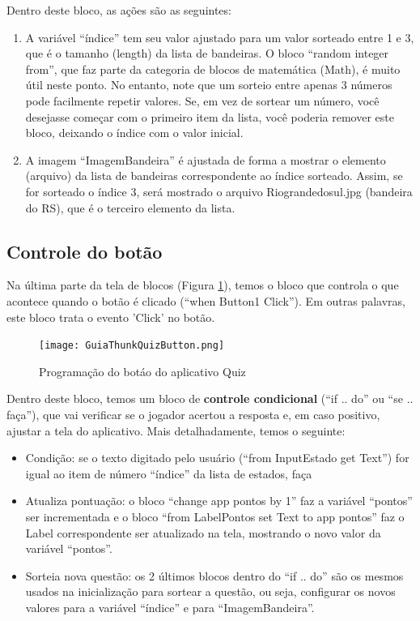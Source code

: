 \documentclass[11pt,fleqn]{book} %
\begin{document}
	


Dentro deste bloco, as ações são as seguintes:
\begin{enumerate}
\item A variável ``índice'' tem seu valor ajustado para um valor sorteado entre 1 e 3, que é o tamanho (length) da lista de bandeiras. O bloco ``random integer from'', que faz parte da categoria de blocos de matemática (Math), é muito útil neste ponto. No entanto, note que um sorteio entre apenas 3 números pode facilmente repetir valores. Se, em vez de sortear um número, você desejasse começar com o primeiro item da lista, você poderia remover este bloco, deixando o índice com o valor inicial.
\item A imagem ``ImagemBandeira'' é ajustada de forma a mostrar o elemento (arquivo) da lista de bandeiras correspondente ao índice sorteado. Assim, se for sorteado o índice 3, será mostrado o arquivo Riograndedosul.jpg (bandeira do RS), que é o terceiro elemento da lista.

\end{enumerate}

\subsection{Controle do botão}

Na última parte da tela de blocos (Figura \ref{fig:quizbutton}), temos o bloco que controla o que acontece quando o botão é clicado (``when Button1 Click''). Em outras palavras, este bloco trata o evento 'Click' no botão. 

\begin{figure}[H]
	\centering
	\texttt{[image: GuiaThunkQuizButton.png]}\hspace{0.2cm}
    \caption{Programação do botáo do aplicativo Quiz}\label{fig:quizbutton}
\end{figure} 


Dentro deste bloco, temos um bloco de \textbf{controle condicional} (``if .. do'' ou ``se .. faça''), que vai verificar se o jogador acertou a resposta e, em caso positivo, ajustar a tela do aplicativo. Mais detalhadamente, temos o seguinte:
\begin{itemize}
    \item Condição: se o texto digitado pelo usuário (``from InputEstado get Text'') for igual ao item de número ``índice'' da lista de estados, faça
    \item Atualiza pontuação: o bloco ``change app pontos by 1'' faz a variável ``pontos'' ser incrementada e o bloco ``from LabelPontos set Text to app pontos'' faz o Label correspondente ser atualizado na tela, mostrando o novo valor da variável ``pontos''.
    \item Sorteia nova questão: os 2 últimos blocos dentro do ``if .. do'' são os mesmos usados na inicialização para sortear a questão, ou seja, configurar os novos valores para a variável ``índice'' e  para ``ImagemBandeira''.
\end{itemize}
\end{document}
